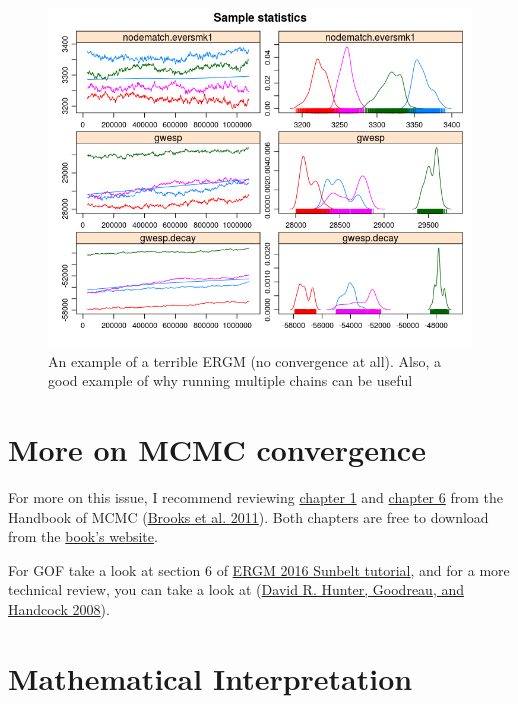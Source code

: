 \documentclass[
]{book}
\begin{document}
\begin{figure}[!h]
\includegraphics[width=9.92in]{awful-chains} \caption{An example of a terrible ERGM (no convergence at all). Also, a good example of why running multiple chains can be useful}\label{fig:badconvergence}
\end{figure}

\hypertarget{more-on-mcmc-convergence}{%
\section{More on MCMC convergence}\label{more-on-mcmc-convergence}}

For more on this issue, I recommend reviewing \href{http://www.mcmchandbook.net/HandbookChapter1.pdf}{chapter 1} and \href{http://www.mcmchandbook.net/HandbookChapter6.pdf}{chapter 6} from the Handbook of MCMC (\protect\hyperlink{ref-brooks2011}{Brooks et al. 2011}). Both chapters are free to download from the \href{http://www.mcmchandbook.net/HandbookSampleChapters.html}{book's website}.

For GOF take a look at section 6 of \href{https://statnet.csde.washington.edu/trac/raw-attachment/wiki/Sunbelt2016/ergm_tutorial.html}{ERGM 2016 Sunbelt tutorial}, and for a more technical review, you can take a look at (\protect\hyperlink{ref-HunterJASA2008}{David R. Hunter, Goodreau, and Handcock 2008}).

\hypertarget{mathematical-interpretation}{%
\section{Mathematical Interpretation}\label{mathematical-interpretation}}
\end{document}
